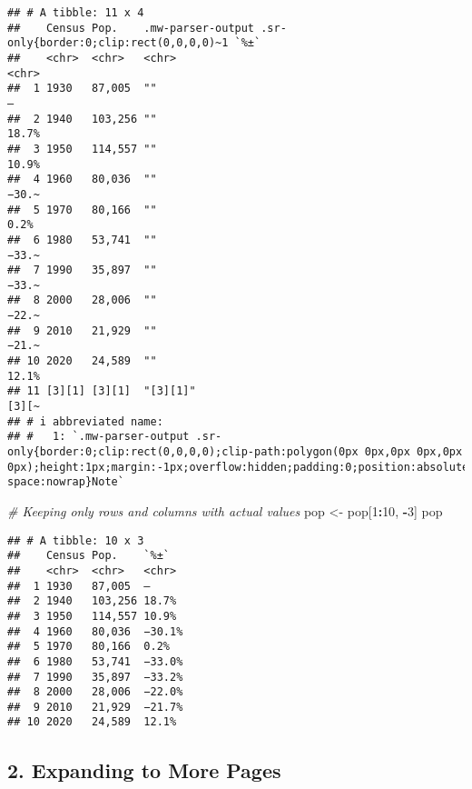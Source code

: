 \documentclass[
]{article}
\newenvironment{Shaded}{\begin{snugshade}}{\end{snugshade}}
\newcommand{\CommentTok}[1]{\textcolor[rgb]{0.56,0.35,0.01}{\textit{#1}}}
\newcommand{\DecValTok}[1]{\textcolor[rgb]{0.00,0.00,0.81}{#1}}
\newcommand{\NormalTok}[1]{#1}
\newcommand{\OtherTok}[1]{\textcolor[rgb]{0.56,0.35,0.01}{#1}}
\newcommand{\SpecialCharTok}[1]{\textcolor[rgb]{0.81,0.36,0.00}{\textbf{#1}}}
\begin{document}
\begin{verbatim}
## # A tibble: 11 x 4
##    Census Pop.    .mw-parser-output .sr-only{border:0;clip:rect(0,0,0,0)~1 `%±` 
##    <chr>  <chr>   <chr>                                                    <chr>
##  1 1930   87,005  ""                                                       —    
##  2 1940   103,256 ""                                                       18.7%
##  3 1950   114,557 ""                                                       10.9%
##  4 1960   80,036  ""                                                       −30.~
##  5 1970   80,166  ""                                                       0.2% 
##  6 1980   53,741  ""                                                       −33.~
##  7 1990   35,897  ""                                                       −33.~
##  8 2000   28,006  ""                                                       −22.~
##  9 2010   21,929  ""                                                       −21.~
## 10 2020   24,589  ""                                                       12.1%
## 11 [3][1] [3][1]  "[3][1]"                                                 [3][~
## # i abbreviated name:
## #   1: `.mw-parser-output .sr-only{border:0;clip:rect(0,0,0,0);clip-path:polygon(0px 0px,0px 0px,0px 0px);height:1px;margin:-1px;overflow:hidden;padding:0;position:absolute;width:1px;white-space:nowrap}Note`
\end{verbatim}

\begin{Shaded}
\begin{Highlighting}[]
\CommentTok{\# Keeping only rows and columns with actual values}
\NormalTok{pop }\OtherTok{\textless{}{-}}\NormalTok{ pop[}\DecValTok{1}\SpecialCharTok{:}\DecValTok{10}\NormalTok{, }\SpecialCharTok{{-}}\DecValTok{3}\NormalTok{]}
\NormalTok{pop}
\end{Highlighting}
\end{Shaded}

\begin{verbatim}
## # A tibble: 10 x 3
##    Census Pop.    `%±`  
##    <chr>  <chr>   <chr> 
##  1 1930   87,005  —     
##  2 1940   103,256 18.7% 
##  3 1950   114,557 10.9% 
##  4 1960   80,036  −30.1%
##  5 1970   80,166  0.2%  
##  6 1980   53,741  −33.0%
##  7 1990   35,897  −33.2%
##  8 2000   28,006  −22.0%
##  9 2010   21,929  −21.7%
## 10 2020   24,589  12.1%
\end{verbatim}

\hypertarget{expanding-to-more-pages}{%
\subsection{2. Expanding to More Pages}\label{expanding-to-more-pages}}
\end{document}
